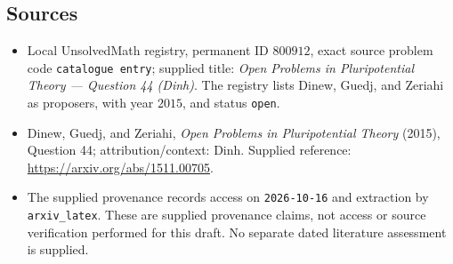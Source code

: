 \documentclass[11pt]{article}
\begin{document}
\subsection{Sources}
\begin{itemize}
\item Local UnsolvedMath registry, permanent ID \(800912\), exact source problem code \texttt{catalogue entry}; supplied title: \emph{Open Problems in Pluripotential Theory --- Question 44 (Dinh)}. The registry lists Dinew, Guedj, and Zeriahi as proposers, with year \(2015\), and status \texttt{open}.
\item Dinew, Guedj, and Zeriahi, \emph{Open Problems in Pluripotential Theory} (2015), Question 44; attribution/context: Dinh. Supplied reference: \url{https://arxiv.org/abs/1511.00705}.
\item The supplied provenance records access on \texttt{2026-10-16} and extraction by \texttt{arxiv\_latex}. These are supplied provenance claims, not access or source verification performed for this draft. No separate dated literature assessment is supplied.
\end{itemize}
\end{document}
